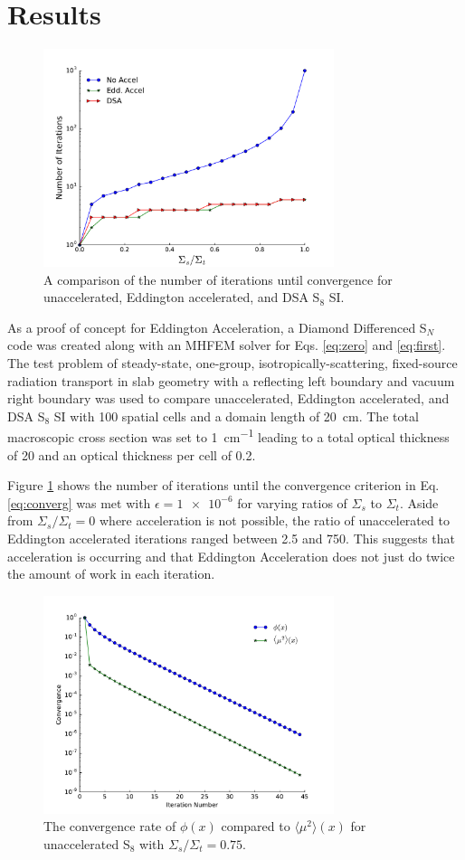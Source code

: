 \documentclass{anstrans}
\newcommand{\SN}{S$_N$\xspace}
\newcommand{\edd}{\langle \mu^2 \rangle}
\begin{document}
\section{Results}
	\begin{figure}
		\centering
		\includegraphics[width=8.5cm]{accel.pdf}
		\caption{A comparison of the number of iterations until convergence for unaccelerated, Eddington accelerated, and DSA S$_8$ SI. }
		\label{fig:comparison}
	\end{figure}

	As a proof of concept for Eddington Acceleration, a Diamond Differenced \SN code was created along with an MHFEM solver for Eqs. \ref{eq:zero} and \ref{eq:first}. The test problem of steady-state, one-group, isotropically-scattering, fixed-source radiation transport in slab geometry with a reflecting left boundary and vacuum right boundary was used to compare unaccelerated, Eddington accelerated, and DSA S$_8$ SI with 100 spatial cells and a domain length of \SI{20}{cm}. The total macroscopic cross section was set to \SI{1}{cm^{-1}} leading to a total optical thickness of 20 and an optical thickness per cell of 0.2. 

	Figure \ref{fig:comparison} shows the number of iterations until the convergence criterion in  Eq. \ref{eq:converg} was met with $\epsilon = \num{1e-6}$ for varying ratios of $\Sigma_s$ to $\Sigma_t$. Aside from $\Sigma_s/\Sigma_t = 0$ where acceleration is not possible, the ratio of unaccelerated to Eddington accelerated iterations ranged between 2.5 and 750. This suggests that acceleration is occurring and that Eddington Acceleration does not just do twice the amount of work in each iteration. 

	\begin{figure}
		\centering
		\includegraphics[width=8.5cm]{eddCon_si.pdf}
		\caption{The convergence rate of $\phi(x)$ compared to $\edd(x)$ for unaccelerated S$_8$ with $\Sigma_s/\Sigma_t = 0.75$. }
		\label{fig:conv_si}
	\end{figure}
\end{document}
